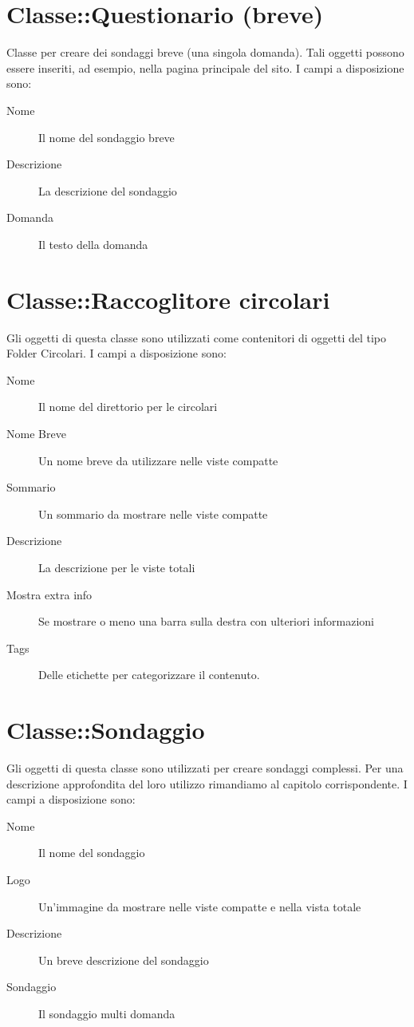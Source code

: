 \section{Classe::Questionario (breve)}
Classe per creare dei sondaggi breve (una singola domanda). Tali oggetti possono essere inseriti, ad esempio, nella pagina principale del sito. I campi a disposizione sono:
\begin{description}
\item[Nome]Il nome del sondaggio breve
\item[Descrizione]La descrizione del sondaggio
\item[Domanda]Il testo della domanda
\end{description}

\section{Classe::Raccoglitore circolari}
Gli oggetti di questa classe sono utilizzati come contenitori di oggetti del tipo Folder Circolari. I campi a disposizione sono:
\begin{description}
\item[Nome] Il nome del direttorio per le circolari
\item[Nome Breve]Un nome breve da utilizzare nelle viste compatte
\item[Sommario]Un sommario da mostrare nelle viste compatte
\item[Descrizione]La descrizione per le viste totali
\item[Mostra extra info]Se mostrare o meno una barra sulla destra con ulteriori informazioni
\item[Tags]Delle etichette per categorizzare il contenuto.
\end{description}

\section{Classe::Sondaggio}
Gli oggetti di questa classe sono utilizzati per creare sondaggi complessi. Per una descrizione approfondita del loro utilizzo rimandiamo al capitolo corrispondente. I campi a disposizione sono:
\begin{description}
\item[Nome]Il nome del sondaggio
\item[Logo]Un'immagine da mostrare nelle viste compatte e nella vista totale
\item[Descrizione]Un breve descrizione del sondaggio
\item[Sondaggio]Il sondaggio multi domanda
\end{description}


